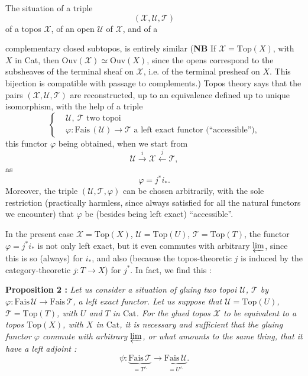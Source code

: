 \documentclass[11pt]{article}
\newcommand{\printedpage}[1]{\marginpar{\footnotesize p.~#1}}
\newcommand{\msp}[1]{\marginpar{\footnotesize [#1]}}
\begin{document}
The situation of a triple
\[
(\mathcal{X},\mathcal{U},\mathcal{T})
\]
of a topos $\mathcal{X}$, of an open $\mathcal{U}$ of $\mathcal{X}$, and of a

\msp{page 62}

complementary closed subtopos, is entirely similar (\textbf{NB} If $\mathcal{X} = \mathrm{Top}(X)$, with $X$ in Cat, then $\mathrm{Ouv}(\mathcal{X}) \simeq \mathrm{Ouv}(X)$, since the opens correspond to the subsheaves of the terminal sheaf on $\mathcal{X}$, i.e. of the terminal presheaf on $X$. This bijection is compatible with passage to complements.) Topos theory says that the pairs $(\mathcal{X},\mathcal{U},\mathcal{T})$ are reconstructed, up to an equivalence defined up to unique isomorphism, with the help of a triple
\[
\left\{\begin{aligned}
&\mathcal{U},\ \mathcal{T} \text{ two topoi}\\[1ex]
&\varphi : \mathrm{Fais}\,(\mathcal{U}) \longrightarrow \mathcal{T} \text{ a left exact functor (``accessible''),}
\end{aligned}\right.
\]
this functor $\varphi$ being obtained, when we start from
\[
\mathcal{U} \xrightarrow{\;i\;} \mathcal{X} \xleftarrow{\;j\;} \mathcal{T},
\]
as
\[
\varphi = j^*i_*.
\]
Moreover, the triple $(\mathcal{U},\mathcal{T},\varphi)$ can be chosen arbitrarily, with the sole restriction (practically harmless, since always satisfied for all the natural functors we encounter) that $\varphi$ be (besides being left exact) ``accessible''.

In the present case $\mathcal{X} = \mathrm{Top}(X)$, $\mathcal{U} = \mathrm{Top}(U)$, $\mathcal{T} = \mathrm{Top}(T)$, the functor $\varphi = j^*i_*$ is not only left exact, but it even commutes with arbitrary $\varprojlim$, since this is so (always) for $i_*$, and also (because the topos-theoretic $j$ is induced by the category-theoretic $j : T \longrightarrow X$) for $j^*$. In fact, we
\printedpage{46}
\msp{page 63}
find this :

\textbf{Proposition 2 :} \textit{Let us consider a situation of gluing two topoi $\mathcal{U}$, $\mathcal{T}$ by $\varphi : \mathrm{Fais}\,\mathcal{U} \longrightarrow \mathrm{Fais}\,\mathcal{T}$, a left exact functor. Let us suppose that $\mathcal{U} = \mathrm{Top}(U)$, $\mathcal{T} = \mathrm{Top}(T)$, with $U$ and $T$ in $\mathrm{Cat}$. For the glued topos $\mathcal{X}$ to be equivalent to a topos $\mathrm{Top}(X)$, with $X$ in $\mathrm{Cat}$, it is necessary and sufficient that the gluing functor $\varphi$ commute with arbitrary $\varprojlim$, or what amounts to the same thing, that it have a left adjoint :}
\[
\psi : \underbrace{\mathrm{Fais}\,\mathcal{T}}_{= T^\wedge} \longrightarrow \underbrace{\mathrm{Fais}\,\mathcal{U}}_{= U^\wedge}.
\]
\end{document}
